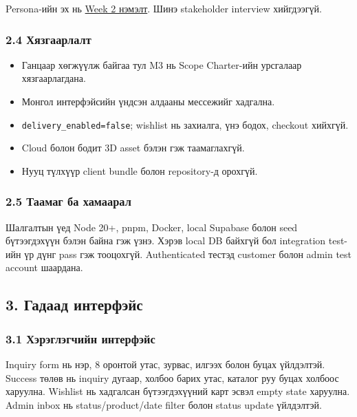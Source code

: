 \documentclass[
  mongolian,
]{article}
\providecommand{\tightlist}{%
  \setlength{\itemsep}{0pt}\setlength{\parskip}{0pt}}
\begin{document}
Persona-ийн эх нь \href{../ICSI438/sem2/wiki/persona-and-pivot.md}{Week
2 нэмэлт}. Шинэ stakeholder interview хийгдээгүй.

\subsubsection{2.4
Хязгаарлалт}\label{ux445ux44fux437ux433ux430ux430ux440ux43bux430ux43bux442}

\begin{itemize}
\tightlist
\item
  Ганцаар хөгжүүлж байгаа тул M3 нь Scope Charter-ийн урсгалаар
  хязгаарлагдана.
\item
  Монгол интерфэйсийн үндсэн алдааны мессежийг хадгална.
\item
  \texttt{delivery\_enabled=false}; wishlist нь захиалга, үнэ бодох,
  checkout хийхгүй.
\item
  Cloud болон бодит 3D asset бэлэн гэж таамаглахгүй.
\item
  Нууц түлхүүр client bundle болон repository-д орохгүй.
\end{itemize}

\subsubsection{2.5 Таамаг ба
хамаарал}\label{ux442ux430ux430ux43cux430ux433-ux431ux430-ux445ux430ux43cux430ux430ux440ux430ux43b}

Шалгалтын үед Node 20+, pnpm, Docker, local Supabase болон seed
бүтээгдэхүүн бэлэн байна гэж үзнэ. Хэрэв local DB байхгүй бол
integration test-ийн үр дүнг pass гэж тооцохгүй. Authenticated тестэд
customer болон admin test account шаардана.

\subsection{3. Гадаад
интерфэйс}\label{ux433ux430ux434ux430ux430ux434-ux438ux43dux442ux435ux440ux444ux44dux439ux441}

\subsubsection{3.1 Хэрэглэгчийн
интерфэйс}\label{ux445ux44dux440ux44dux433ux43bux44dux433ux447ux438ux439ux43d-ux438ux43dux442ux435ux440ux444ux44dux439ux441}

Inquiry form нь нэр, 8 оронтой утас, зурвас, илгээх болон буцах
үйлдэлтэй. Success төлөв нь inquiry дугаар, холбоо барих утас, каталог
руу буцах холбоос харуулна. Wishlist нь хадгалсан бүтээгдэхүүний карт
эсвэл empty state харуулна. Admin inbox нь status/product/date filter
болон status update үйлдэлтэй.
\end{document}
